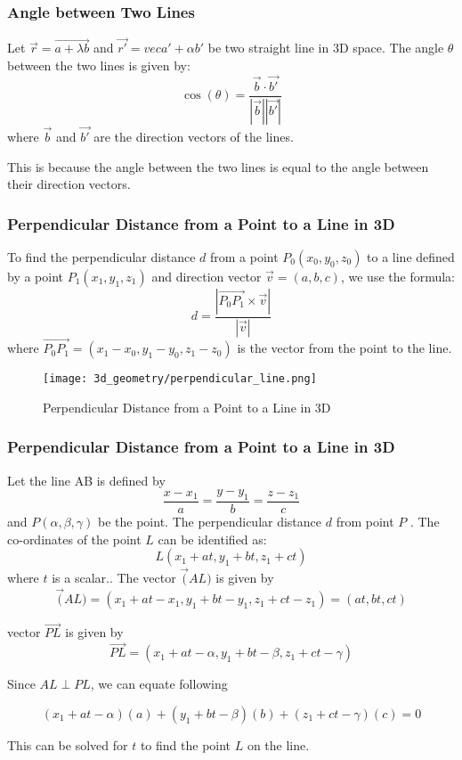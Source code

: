 \begin{frame}
    \frametitle{Angle between Two Lines}
    Let \(\vec{r} = \vec{a+ \lambda b}\) and \(\vec{r'} = vec{a'} + \alpha b'\) be two straight line in 3D space. The angle \(\theta\) between the two lines is given by:
    \[
    \cos(\theta) = \frac{\vec{b} \cdot \vec{b'}}{|\vec{b}| |\vec{b'}|}
    \]
    where \(\vec{b}\) and \(\vec{b'}\) are the direction vectors of the lines.

    This is because the angle between the two lines is equal to the angle between their direction vectors.
\end{frame}

\begin{frame}
    \frametitle{Perpendicular Distance from a Point to a Line in 3D}
    To find the perpendicular distance \(d\) from a point \(P_0(x_0, y_0, z_0)\) to a line defined by a point \(P_1(x_1, y_1, z_1)\) and direction vector \(\vec{v} = (a, b, c)\), we use the formula:
    \[
    d = \frac{|\vec{P_0P_1} \times \vec{v}|}{|\vec{v}|}
    \]
    where \(\vec{P_0P_1} = (x_1 - x_0, y_1 - y_0, z_1 - z_0)\) is the vector from the point to the line.        
\end{frame}


\begin{frame}
\begin{figure}
    \texttt{[image: 3d\_geometry/perpendicular\_line.png]}
    \caption{Perpendicular Distance from a Point to a Line in 3D}
\end{figure}
\end{frame}
\begin{frame}
    \frametitle{Perpendicular Distance from a Point to a Line in 3D}
    Let the line AB is defined by 
    \[\frac{x-x_{1}}{a} = \frac{y-y_{1}}{b} = \frac{z-z_{1}}{c}\]
    and \(P(\alpha, \beta, \gamma)\) be the point. The perpendicular distance \(d\) from point \(P\) . The co-ordinates of the point \(L\) can be identified as:
    \[L(x_{1}+at, y_{1}+bt, z_{1}+ct)\]  
    where \(t\) is a scalar.. The vector \(\vec(AL)\) is given by 
    \[\vec(AL) = (x_{1}+at - x_{1}, y_{1}+bt - y_{1}, z_{1}+ct - z_{1}) = (at, bt, ct)\] 
\end{frame} 

\begin{frame}
    
    vector \(\vec{PL} \) is given by 
    \[\vec{PL} = (x_{1}+at - \alpha, y_{1}+bt - \beta, z_{1}+ct - \gamma)\]  
    
    Since \(AL \perp PL\), we can equate following

    \[(x_{1}+at-\alpha)(a) + (y_{1}+bt-\beta)(b) + (z_{1}+ct-\gamma)(c) = 0\]

    This can be solved for \(t\) to find the point \(L\) on the line.

\end{frame}

